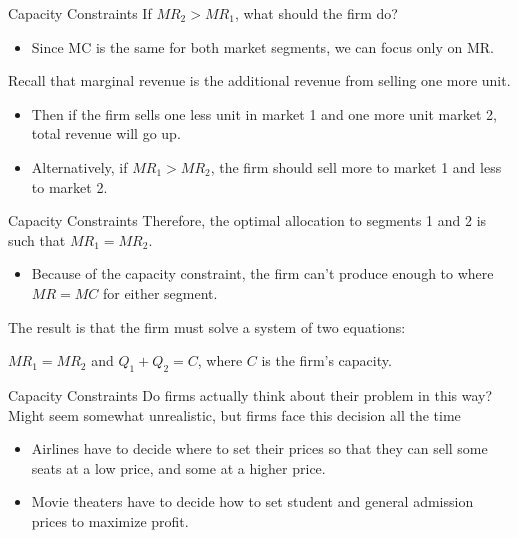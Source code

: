 \documentclass[11pt,t]{beamer}
\begin{document}
\begin{frame}{Capacity Constraints}
  If $MR_2 > MR_1$, what should the firm do?

  \begin{itemize}
    \item Since MC is the same for both market segments, we can focus only on MR.
  \end{itemize}
  
  \bigskip
  Recall that marginal revenue is the additional revenue from selling one more unit.

  \begin{itemize}
    \item Then if the firm sells one less unit in market 1 and one more unit market 2, total revenue will go up.
    \item Alternatively, if $MR_1>MR_2$, the firm should sell more to market 1 and less to market 2.
  \end{itemize}
\end{frame}

\begin{frame}{Capacity Constraints}
  Therefore, the optimal allocation to segments 1 and 2 is such that $MR_1 = MR_2$.

  \begin{itemize}
    \item Because of the capacity constraint, the firm can't produce enough to where $MR=MC$ for either segment.
  \end{itemize}

  \bigskip
  The result is that the firm must solve a system of two equations:

  $MR_1 = MR_2$ and $Q_1 + Q_2 = C$, where $C$ is the firm's capacity.
\end{frame}

\begin{frame}{Capacity Constraints}
  Do firms actually think about their problem in this way? Might seem somewhat unrealistic, but firms face this decision all the time

  \begin{itemize}
    \item Airlines have to decide where to set their prices so that they can sell some seats at a low price, and some at a higher price.
    \item Movie theaters have to decide how to set student and general admission prices to maximize profit.
  \end{itemize}
\end{frame}
\end{document}
